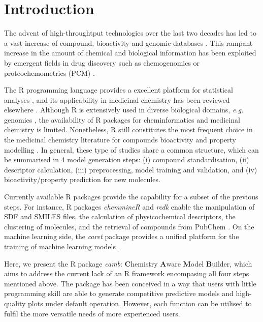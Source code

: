 \documentclass{bioinfo}
\begin{document}
\section{Introduction}

The advent of high-throughtput technologies over the last two decades 
has led to a vast increase of compound, bioactivity
and genomic databases \citep{bender_databases}.
This rampant increase in the amount of chemical and biological information 
has been exploited by emergent fields in drug discovery 
such as chemogenomics or proteochemometrics (PCM) \citep{review_pcm,cortesReview}.

The R programming language provides a excellent platform for statistical analyses \citep{Rlanguage},
and its applicability in medicinal chemistry has been reviewed elsewhere \citep{mente}.
Although R is extensively used in diverse biological domains, {\it e.g.} genomics \citep{bioconductor},
the availability of R packages for cheminformatics and medicinal chemistry is limited. %
Nonetheless, R still constitutes the most frequent choice in the medicinal chemistry literature
for compounds bioactivity and property modelling \citep{mente}.
In general, these type of studies share a common structure, which can be summarised in 4 model generation steps:
(i) compound standardisation, (ii) descriptor calculation,
(iii) preprocessing, model training and validation, and (iv) bioactivity/property prediction for new molecules.

Currently available R packages provide the capability for a subset of the previous steps.
For instance, R packages {\it chemmineR} \citep{chemmineR} and {\it rcdk} \citep{rcdk} enable the manipulation of SDF and SMILES
files, the calculation of physicochemical descriptors, the clustering of molecules,
and the retrieval of compounds from PubChem \citep{pubchem}.
On the machine learning side, the {\it caret} package provides a
unified platform for the training of machine learning models \citep{caret}.

Here, we present the R package {\it camb}: {\bf C}hemistry {\bf A}ware {\bf M}odel {\bf B}uilder,
which aims to address the current lack of an R framework encompasing all four steps mentioned above.
The package has been conceived in a way that users with little
programming skill are able to generate competitive predictive models and high-quality plots
under default operation.
However, each function can be utilised to fulfil the more versatile needs of more experienced users.
\end{document}
